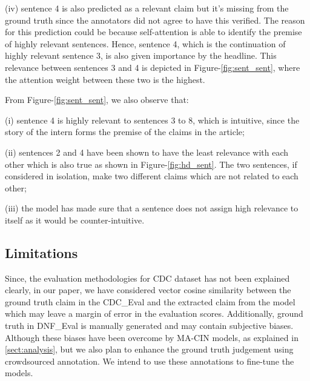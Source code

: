 \documentclass[11pt,a4paper]{article}
\begin{document}
(iv) sentence 4 is also predicted as a relevant claim but it's missing from the ground truth since the annotators did not agree to have this verified. The reason for this prediction could be because self-attention is able to identify the premise of highly relevant sentences. Hence, sentence 4, which is the continuation of highly relevant sentence 3, is also given importance by the headline. This relevance between sentences 3 and 4 is depicted in Figure-\ref{fig:sent_sent}, where the attention weight between these two is the highest. 

From Figure-\ref{fig:sent_sent}, we also observe that:

(i) sentence 4 is highly relevant to sentences 3 to 8, which is intuitive, since the story of the intern forms the premise of the claims in the article;

(ii) sentences 2 and 4 have been shown to have the least relevance with each other which is also true as shown in Figure-\ref{fig:hd_sent}. The two sentences, if considered in isolation, make two different claims which are not related to each other;

(iii) the model has made sure that a sentence does not assign high relevance to itself as it would be counter-intuitive.

\subsection{Limitations}
\label{sect:limitation}
Since, the evaluation methodologies for CDC dataset has not been explained clearly, in our paper, we have considered vector cosine similarity between the ground truth claim in the CDC\_Eval and the extracted claim from the model which may leave a margin of error in the evaluation scores. Additionally, ground truth in DNF\_Eval is manually generated and may contain subjective biases. Although these biases have been overcome by MA-CIN models, as explained in \ref{sect:analysis}, but we also plan to enhance the ground truth judgement using crowdsourced annotation. We intend to use these annotations to fine-tune the models.
\end{document}

